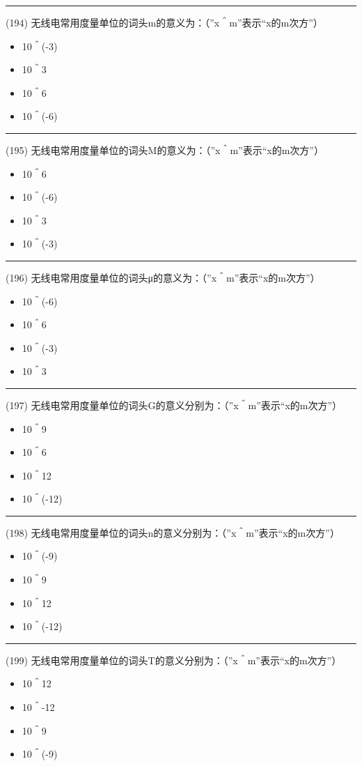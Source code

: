 \documentclass[twocolumn]{ctexart}  %
\begin{document}
\noindent\rule{0.5\textwidth}{1pt}
\heiti (194) 无线电常用度量单位的词头m的意义为：（”x＾m”表示“x的m次方”） \songti {\color{gray} [LK0467] }
\begin{itemize}
	\item  10＾(-3)
	\item  10＾3
	\item  10＾6
	\item  10＾(-6)
\end{itemize}


\noindent\rule{0.5\textwidth}{1pt}
\heiti (195) 无线电常用度量单位的词头M的意义为：（”x＾m”表示“x的m次方”） \songti {\color{gray} [LK0468] }
\begin{itemize}
	\item  10＾6
	\item  10＾(-6)
	\item  10＾3
	\item  10＾(-3)
\end{itemize}


\noindent\rule{0.5\textwidth}{1pt}
\heiti (196) 无线电常用度量单位的词头μ的意义为：（”x＾m”表示“x的m次方”） \songti {\color{gray} [LK0469] }
\begin{itemize}
	\item  10＾(-6)
	\item  10＾6
	\item  10＾(-3)
	\item  10＾3
\end{itemize}


\noindent\rule{0.5\textwidth}{1pt}
\heiti (197) 无线电常用度量单位的词头G的意义分别为：（”x＾m”表示“x的m次方”） \songti {\color{gray} [LK0470] }
\begin{itemize}
	\item  10＾9
	\item  10＾6
	\item  10＾12
	\item  10＾(-12)
\end{itemize}


\noindent\rule{0.5\textwidth}{1pt}
\heiti (198) 无线电常用度量单位的词头n的意义分别为：（”x＾m”表示“x的m次方”） \songti {\color{gray} [LK0471] }
\begin{itemize}
	\item  10＾(-9)
	\item  10＾9
	\item  10＾12
	\item  10＾(-12)
\end{itemize}


\noindent\rule{0.5\textwidth}{1pt}
\heiti (199) 无线电常用度量单位的词头T的意义分别为：（”x＾m”表示“x的m次方”） \songti {\color{gray} [LK0472] }
\begin{itemize}
	\item  10＾12
	\item  10＾-12
	\item  10＾9
	\item  10＾(-9)
\end{itemize}
\end{document}
